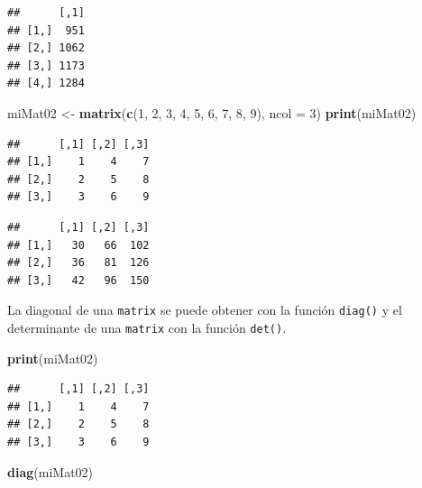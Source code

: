 \documentclass[]{book}
\newenvironment{Shaded}{\begin{snugshade}}{\end{snugshade}}
\newcommand{\KeywordTok}[1]{\textcolor[rgb]{0.13,0.29,0.53}{\textbf{#1}}}
\newcommand{\DataTypeTok}[1]{\textcolor[rgb]{0.13,0.29,0.53}{#1}}
\newcommand{\DecValTok}[1]{\textcolor[rgb]{0.00,0.00,0.81}{#1}}
\newcommand{\StringTok}[1]{\textcolor[rgb]{0.31,0.60,0.02}{#1}}
\newcommand{\OperatorTok}[1]{\textcolor[rgb]{0.81,0.36,0.00}{\textbf{#1}}}
\newcommand{\NormalTok}[1]{#1}
\begin{document}
\begin{verbatim}
##      [,1]
## [1,]  951
## [2,] 1062
## [3,] 1173
## [4,] 1284
\end{verbatim}

\begin{Shaded}
\begin{Highlighting}[]
\NormalTok{miMat02 <-}\StringTok{ }\KeywordTok{matrix}\NormalTok{(}\KeywordTok{c}\NormalTok{(}\DecValTok{1}\NormalTok{, }\DecValTok{2}\NormalTok{, }\DecValTok{3}\NormalTok{, }\DecValTok{4}\NormalTok{, }\DecValTok{5}\NormalTok{, }\DecValTok{6}\NormalTok{, }\DecValTok{7}\NormalTok{, }\DecValTok{8}\NormalTok{, }\DecValTok{9}\NormalTok{), }\DataTypeTok{ncol =} \DecValTok{3}\NormalTok{)}
\KeywordTok{print}\NormalTok{(miMat02)}
\end{Highlighting}
\end{Shaded}

\begin{verbatim}
##      [,1] [,2] [,3]
## [1,]    1    4    7
## [2,]    2    5    8
## [3,]    3    6    9
\end{verbatim}

\begin{Shaded}
\end{Shaded}

\begin{verbatim}
##      [,1] [,2] [,3]
## [1,]   30   66  102
## [2,]   36   81  126
## [3,]   42   96  150
\end{verbatim}

La diagonal de una \texttt{matrix} se puede obtener con la función
\texttt{diag()} y el determinante de una \texttt{matrix} con la función
\texttt{det()}.

\begin{Shaded}
\begin{Highlighting}[]
\KeywordTok{print}\NormalTok{(miMat02)}
\end{Highlighting}
\end{Shaded}

\begin{verbatim}
##      [,1] [,2] [,3]
## [1,]    1    4    7
## [2,]    2    5    8
## [3,]    3    6    9
\end{verbatim}

\begin{Shaded}
\begin{Highlighting}[]
\KeywordTok{diag}\NormalTok{(miMat02)}
\end{Highlighting}
\end{Shaded}
\end{document}
